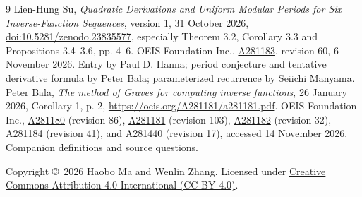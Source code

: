 \documentclass[11pt]{article}
\begin{document}
\begin{thebibliography}{9}
 Lien-Hung Su,
\emph{Quadratic Derivations and Uniform Modular Periods for Six
Inverse-Function Sequences}, version 1, 31 October 2026,
\href{https://doi.org/10.5281/zenodo.23835577}{doi:10.5281/zenodo.23835577},
especially Theorem 3.2, Corollary 3.3 and Propositions 3.4--3.6, pp. 4--6.
 OEIS Foundation Inc.,
\href{https://oeis.org/A281183}{A281183}, revision 60, 6 November 2026.
Entry by Paul D. Hanna; period conjecture and tentative derivative
formula by Peter Bala; parameterized recurrence by Seiichi Manyama.
 Peter Bala,
\emph{The method of Graves for computing inverse functions},
26 January 2026, Corollary 1, p. 2,
\url{https://oeis.org/A281181/a281181.pdf}.
 OEIS Foundation Inc.,
\href{https://oeis.org/A281180}{A281180} (revision 86),
\href{https://oeis.org/A281181}{A281181} (revision 103),
\href{https://oeis.org/A281182}{A281182} (revision 32),
\href{https://oeis.org/A281184}{A281184} (revision 41), and
\href{https://oeis.org/A281440}{A281440} (revision 17),
accessed 14 November 2026. Companion definitions and source questions.
\end{thebibliography}
\medskip\noindent
\small Copyright \copyright\ 2026 Haobo Ma and Wenlin Zhang.
Licensed under \href{https://creativecommons.org/licenses/by/4.0/}{Creative Commons Attribution 4.0 International (CC BY 4.0)}.
\end{document}
